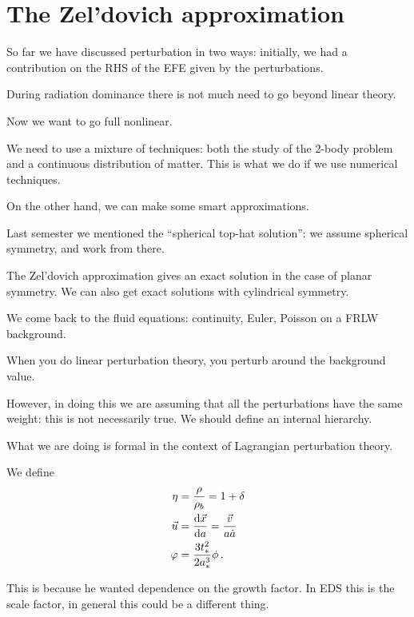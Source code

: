 \documentclass[main.tex]{subfiles}
\begin{document}

\section{The Zel'dovich approximation}

So far we have discussed perturbation in two ways: initially, we had a contribution on the RHS of the EFE given by the perturbations.

During radiation dominance there is not much need to go beyond linear theory. 

Now we want to go full nonlinear.

We need to use a mixture of techniques: both the study of the 2-body problem and a continuous distribution of matter.
This is what we do if we use numerical techniques.

On the other hand, we can make some smart approximations.

Last semester we mentioned the ``spherical top-hat solution'': we assume spherical symmetry, and work from there. 

The Zel'dovich approximation gives an exact solution in the case of planar symmetry.
We can also get exact solutions with cylindrical symmetry. 

We come back to the fluid equations: continuity, Euler, Poisson on a FRLW background. 

When you do linear perturbation theory, you perturb around the background value.

However, in doing this we are assuming that all the perturbations have the same weight: this is not necessarily true. We should define an internal hierarchy. 

What we are doing is formal in the context of Lagrangian perturbation theory. 

We define 
%
\begin{subequations}
\begin{align}
\eta &= \frac{\rho }{ \rho_{b}}  = 1 + \delta  \\
\vec{u} &= \dv{\vec{x}}{a} = \frac{\vec{v}}{a \dot{a} }  \\
\varphi &= \frac{3 t_{*}^2}{2 a_{*}^3} \phi 
\,.
\end{align}
\end{subequations}

This is because he wanted dependence on the growth factor. In EDS this is the scale factor, in general this could be a different thing.
\end{document}
